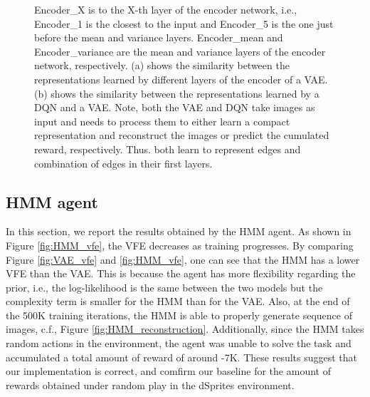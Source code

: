\documentclass[twoside,11pt]{article}
\begin{document}
\begin{figure}[ht!]
\begin{subfigure}{.4\textwidth}
    \end{subfigure}
    \caption{Encoder\_X is to the X-th layer of the encoder network, i.e., Encoder\_1 is the closest to the input and Encoder\_5 is the one just before the mean and variance layers. Encoder\_mean and Encoder\_variance are the mean and variance layers of the encoder network, respectively. (a) shows the similarity between the representations learned by different layers of the encoder of a VAE.
        (b) shows the similarity between the representations learned by a DQN and a VAE. Note, both the VAE and DQN take images as input and needs to process them to either learn a compact representation and reconstruct the images or predict the cumulated reward, respectively. Thus. both learn to represent edges and combination of edges in their first layers.}
    \label{fig:cka-vae}
\end{figure}

\subsection{HMM agent} \label{ssec:hmm_results}

In this section, we report the results obtained by the HMM agent. As shown in Figure \ref{fig:HMM_vfe}, the VFE decreases as training progresses. By comparing Figure \ref{fig:VAE_vfe} and \ref{fig:HMM_vfe}, one can see that the HMM has a lower VFE than the VAE. This is because the agent has more flexibility regarding the prior, i.e., the log-likelihood is the same between the two models but the complexity term is smaller for the HMM than for the VAE. Also, at the end of the 500K training iterations, the HMM is able to properly generate sequence of images, c.f., Figure \ref{fig:HMM_reconstruction}. Additionally, since the HMM takes random actions in the environment, the agent was unable to solve the task and accumulated a total amount of reward of around -7K. These results suggest that our implementation is correct, and comfirm our baseline for the amount of rewards obtained under random play in the dSprites environment.
\end{document}
